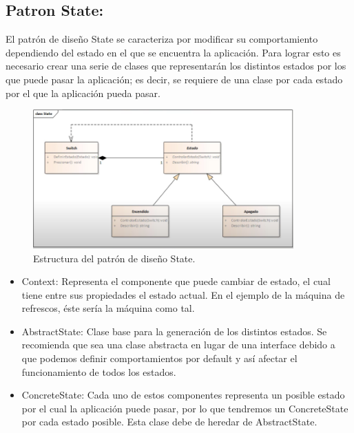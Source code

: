 \documentclass[12pt,letterpaper]{article}
\begin{document}
\subsection{Patron State: }
El patrón de diseño State se caracteriza por modificar 
su comportamiento dependiendo del estado en el que se encuentra 
la aplicación. Para lograr esto es necesario crear una serie de clases 
que representarán los distintos estados por los que puede pasar la aplicación; es decir, se requiere de una clase por cada estado por el que la aplicación pueda pasar.

\begin{figure}[h]
\begin{center}
\includegraphics[width=10cm]{./Imagenes/image4.png}
\caption{Estructura del patrón de diseño State.}
\label{rg4}
\end{center}
\end{figure}

\begin{itemize}
    \item Context: Representa el componente que puede cambiar de estado, el cual tiene entre sus propiedades el estado actual. En el ejemplo de la máquina de refrescos, éste sería la máquina como tal.
    \item AbstractState: Clase base para la generación de los distintos estados. Se recomienda que sea una clase abstracta en lugar de una interface debido a que podemos definir comportamientos por default y así afectar el funcionamiento de todos los estados.
    \item ConcreteState: Cada uno de estos componentes representa un posible estado por el cual la aplicación puede pasar, por lo que tendremos un ConcreteState por cada estado posible. Esta clase debe de heredar de AbstractState.
\end{itemize}
\end{document}
